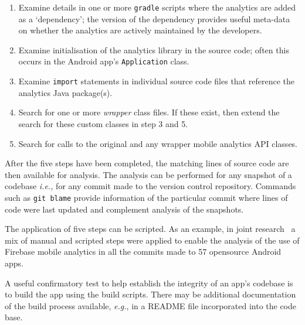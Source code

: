 \begin{enumerate}
    \itemsep 0em
    \item Examine details in one or more \texttt{gradle} scripts where the analytics are added as a `dependency'; the version of the dependency provides useful meta-data on whether the analytics are actively maintained by the developers. %
    \item Examine initialisation of the analytics library in the source code; often this occurs in the Android app's \texttt{Application} class. %
    \item Examine \texttt{import} statements in individual source code files that reference the analytics Java package(s).
    \item Search for one or more \textit{wrapper} class files. If these exist, then extend the search for these custom classes in step 3 and 5.
    \item Search for calls to the original and any wrapper mobile analytics API classes. %
\end{enumerate}

After the five steps have been completed, the matching lines of source code are then available for analysis. 
%
The analysis can be performed for any snapshot of a codebase \textit{i.e.,} for any commit made to the version control repository. Commands such as \texttt{git blame} provide information of the particular commit where lines of code were last updated and complement analysis of the snapshots.

The application of five steps can be scripted. As an example, in joint research~ a mix of manual and scripted steps were applied to enable the analysis of the use of Firebase mobile analytics in all the commits made to 57 opensource Android apps.

A useful confirmatory test to help establish the integrity of an app's codebase is to build the app using the build scripts. There may be additional documentation of the build process available, \textit{e.g.}, in a README file incorporated into the code base.

